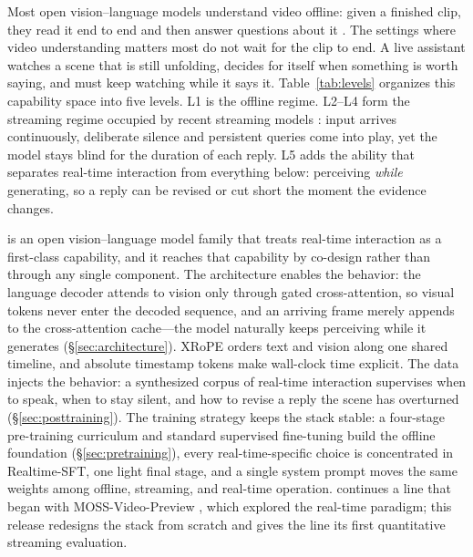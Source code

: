 Most open vision--language models understand video offline: given a
finished clip, they read it end to end and then answer questions about
it \citep{Bai2025qwen,An2026llava,Team2026gemma}. The settings where
video understanding matters most do not wait for the clip to end. A
live assistant watches a scene that is still unfolding, decides for
itself when something is worth saying, and must keep watching while it
says it. Table~\ref{tab:levels} organizes this capability space into
five levels. L1 is the offline regime. L2--L4 form the streaming
regime occupied by recent streaming models
\citep{Wang2024videollm,Fu2025vispeak,Xia2025streaming,Lu2026aura}:
input arrives continuously, deliberate silence and persistent queries
come into play, yet the model stays blind for the duration of each
reply. L5 adds the ability that separates real-time interaction from
everything below: perceiving \emph{while} generating, so a reply can be
revised or cut short the moment the evidence changes.

\mossvl{} is an open vision--language model family that treats
real-time interaction as a first-class capability, and it reaches that
capability by co-design rather than through any single component. The
architecture enables the behavior: the language decoder attends to
vision only through gated cross-attention, so visual tokens never enter
the decoded sequence, and an arriving frame merely appends to the
cross-attention cache---the model naturally keeps perceiving while it
generates (\S\ref{sec:architecture}). XRoPE orders text and vision along one
shared timeline, and absolute timestamp tokens make wall-clock time
explicit. The data injects the behavior: a synthesized corpus of
real-time interaction supervises when to speak, when to stay silent,
and how to revise a reply the scene has overturned
(\S\ref{sec:posttraining}). The training strategy keeps the stack
stable: a four-stage pre-training curriculum and standard supervised
fine-tuning build the offline foundation (\S\ref{sec:pretraining}),
every real-time-specific choice is concentrated in Realtime-SFT, one
light final stage, and a single system prompt moves the same weights
among offline, streaming, and real-time operation. \mossvl{} continues
a line that began with MOSS-Video-Preview \citep{Wang2026moss}, which
explored the real-time paradigm; this release redesigns the stack from
scratch and gives the line its first quantitative streaming evaluation.

